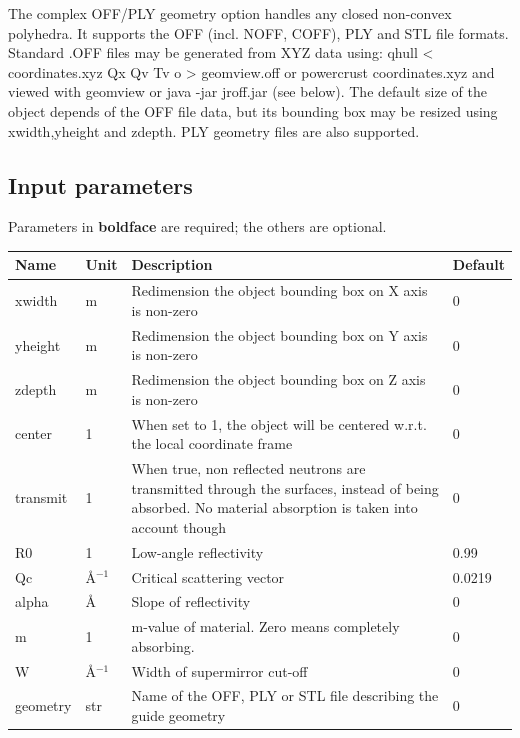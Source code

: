 The complex OFF/PLY geometry option handles any closed non-convex polyhedra. It supports the OFF (incl. NOFF, COFF), PLY and STL file formats. Standard .OFF files may be generated from XYZ data using: qhull \textless{} coordinates.xyz Qx Qv Tv o \textgreater{} geomview.off or powercrust coordinates.xyz and viewed with geomview or java -jar jroff.jar (see below). The default size of the object depends of the OFF file data, but its bounding box may be resized using xwidth,yheight and zdepth. PLY geometry files are also supported.

\subsection*{Input parameters}
Parameters in \textbf{boldface} are required; the others are optional.

\begin{longtable}{p{}p{}p{}p{}}
\toprule
\textbf{Name} & \textbf{Unit} & \textbf{Description} & \textbf{Default} \\
\midrule
\endhead
xwidth & m & Redimension the object bounding box on X axis is non-zero & 0 \\
yheight & m & Redimension the object bounding box on Y axis is non-zero & 0 \\
zdepth & m & Redimension the object bounding box on Z axis is non-zero & 0 \\
center & 1 & When set to 1, the object will be centered w.r.t. the local coordinate frame & 0 \\
transmit & 1 & When true, non reflected neutrons are transmitted through the surfaces, instead of being absorbed. No material absorption is taken into account though & 0 \\
R0 & 1 & Low-angle reflectivity & 0.99 \\
Qc & \AA{}$^{-1}$ & Critical scattering vector & 0.0219 \\
alpha & \AA{} & Slope of reflectivity & 0 \\
m & 1 & m-value of material. Zero means completely absorbing. & 0 \\
W & \AA{}$^{-1}$ & Width of supermirror cut-off & 0 \\
geometry & str & Name of the OFF, PLY or STL file describing the guide geometry & 0 \\
\bottomrule
\end{longtable}

